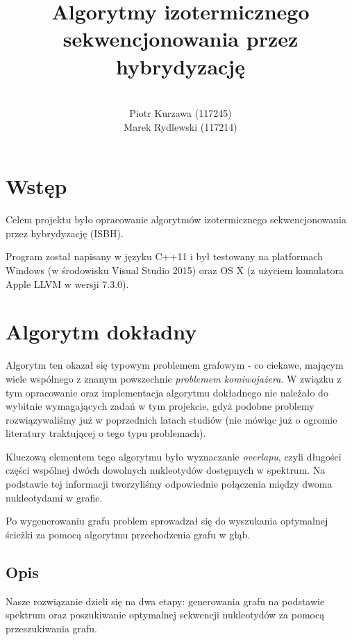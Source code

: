 \documentclass{article}
\title{Algorytmy izotermicznego sekwencjonowania przez hybrydyzację}
\author{ \\ Piotr Kurzawa (117245) \\ Marek Rydlewski (117214)}
\begin{document}
\maketitle

\vspace{3ex}

\tableofcontents

\newpage

\section{Wstęp}

Celem projektu było opracowanie algorytmów izotermicznego sekwencjonowania przez hybrydyzację (ISBH). 



Program został napisany w języku C++11 i był testowany na platformach Windows (w środowisku Visual Studio 2015) oraz OS X (z użyciem komulatora Apple LLVM w wersji 7.3.0). 

\section{Algorytm dokładny}

Algorytm ten okazał się typowym problemem grafowym - co ciekawe, mającym wiele wspólnego z znanym powszechnie \textit{problemem komiwojażera}. W związku z tym opracowanie oraz implementacja algorytmu dokładnego nie należało do wybitnie wymagających zadań w tym projekcie, gdyż podobne problemy rozwiązywaliśmy już w poprzednich latach studiów (nie mówiąc już o ogromie literatury traktującej o tego typu problemach).

Kluczową elementem tego algorytmu było wyznaczanie \textit{overlapu}, czyli długości części wspólnej dwóch dowolnych nukleotydów dostępnych w spektrum. Na podstawie tej informacji tworzyliśmy odpowiednie połączenia między dwoma nukleotydami w grafie.

Po wygenerowaniu grafu problem sprowadzał się do wyszukania optymalnej ścieżki za pomocą algorytmu przechodzenia grafu w głąb.

\subsection{Opis}

Nasze rozwiązanie dzieli się na dwa etapy: generowania grafu na podstawie spektrum oraz poszukiwanie optymalnej sekwencji nukleotydów za pomocą przeszukiwania grafu.
\end{document}
